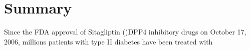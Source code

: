 \section{\label{chap:Sum} Summary}
Since the FDA approval of Sitagliptin ()DPP4 inhibitory drugs on October 17, 2006, millions patients with type II diabetes have been treated with 

